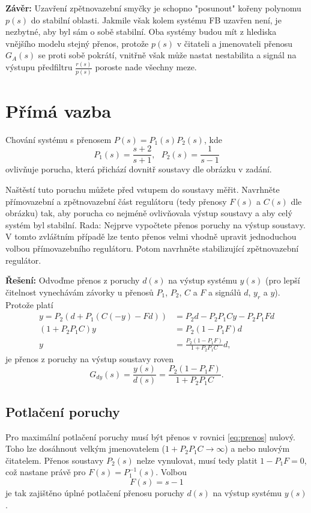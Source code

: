 \documentclass[twoside]{article}
\begin{document}
\textbf{Závěr:} Uzavření zpětnovazební smyčky je schopno "posunout" kořeny polynomu $p(s)$
do stabilní oblasti. Jakmile však kolem systému FB uzavřen není, je nezbytné, aby byl sám o sobě stabilní.
Oba systémy budou mít z hlediska vnějšího modelu stejný přenos, protože $p(s)$ v čitateli a jmenovateli přenosu $G_A(s)$
se proti sobě pokrátí, vnitřně však může nastat nestabilita a signál na výstupu předfiltru $\frac{r(s)}{p(s)}$ poroste nade všechny meze.

\section{Přímá vazba}
Chování systému s přenosem $P(s) = P_1(s) P_2(s)$, kde
\begin{equation}
	P_1(s) = \frac{s+2}{s+1}, ~~~ P_2(s) = \frac{1}{s-1}
\end{equation}
ovlivňuje porucha, která přichází dovnitř soustavy dle obrázku v zadání.

Naštěstí tuto poruchu můžete před vstupem do soustavy měřit. Navrhněte přímovazební a
zpětnovazební část regulátoru (tedy přenosy $F(s)$ a $C(s)$ dle obrázku) tak, aby porucha co nejméně
ovlivňovala výstup soustavy a aby celý systém byl stabilní.
Rada: Nejprve vypočtete přenos poruchy na výstup soustavy. V tomto zvláštním případě lze tento přenos
velmi vhodně upravit jednoduchou volbou přímovazebního regulátoru. Potom navrhněte stabilizující
zpětnovazební regulátor. 

\textbf{Řešení:}
Odvoďme přenos z poruchy $d(s)$ na výstup systému $y(s)$ (pro lepší čitelnost vynechávám závorky u přenosů $P_1$, $P_2$, $C$ a $F$
a signálů $d$, $y_r$ a $y$). Protože platí
\begin{equation}
	\begin{split}
		y = P_2 (d + P_1(C (-y) - F d)) &= P_2 d - P_2 P_1 C y - P_2 P_1 F d\\
		(1 + P_2 P_1 C)y &= P_2(1-P_1 F) d \\
		y &= \frac{P_2(1-P_1 F)}{1 + P_2 P_1 C} d,
	\end{split}
\end{equation}
je přenos z poruchy na výstup soustavy roven
\begin{equation}
	G_{dy}(s) = \frac{y(s)}{d(s)} = \frac{P_2(1-P_1 F)}{1 + P_2 P_1 C}.
	\label{eq:prenos}
\end{equation}

\subsection{Potlačení poruchy}
Pro maximální potlačení poruchy musí být přenos v rovnici \eqref{eq:prenos} nulový. Toho lze dosáhnout velkým jmenovatelem
($1 + P_2 P_1 C \rightarrow \infty$) a nebo nulovým čitatelem. Přenos soustavy $P_2(s)$ nelze vynulovat, musí tedy platit $ 1 - P_1 F = 0$,
což nastane právě pro $F(s) = P_1^{-1} (s)$. Volbou
\begin{equation}
	F(s) = s - 1
\end{equation}
je tak zajištěno úplné potlačení přenosu poruchy $d(s)$ na výstup systému $y(s)$.
\end{document}
